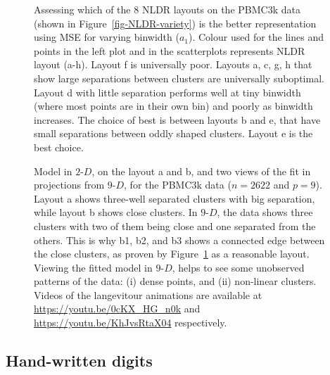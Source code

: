 \documentclass[
  12pt]{article}
\newcommand\gD{$2\text{-}D$}
\begin{document}
\begin{figure}[H]


\caption{\label{fig-pbmc-mse}Assessing which of the 8 NLDR layouts on
the PBMC3k data (shown in Figure~\ref{fig-NLDR-variety}) is the better
representation using MSE for varying binwidth (\(a_1\)). Colour used for
the lines and points in the left plot and in the scatterplots represents
NLDR layout (a-h). Layout f is universally poor. Layouts a, c, g, h that
show large separations between clusters are universally suboptimal.
Layout d with little separation performs well at tiny binwidth (where
most points are in their own bin) and poorly as binwidth increases. The
choice of best is between layouts b and e, that have small separations
between oddly shaped clusters. Layout e is the best choice.}

\end{figure}%

\begin{figure}[H]


\caption{\label{fig-model-pbmc-author-proj}Model in \gD{}, on the layout
a and b, and two views of the fit in projections from \(9\text{-}D\),
for the PBMC3k data (\(n =  2622\) and \(p = 9\)). Layout a shows
three-well separated clusters with big separation, while layout b shows
close clusters. In \(9\text{-}D\), the data shows three clusters with
two of them being close and one separated from the others. This is why
b1, b2, and b3 shows a connected edge between the close clusters, as
proven by Figure~\ref{fig-pbmc-mse} as a reasonable layout. Viewing the
fitted model in \(9\text{-}D\), helps to see some unobserved patterns of
the data: (i) dense points, and (ii) non-linear clusters. Videos of the
langevitour animations are available at
\url{https://youtu.be/0cKX_HG_n0k} and
\url{https://youtu.be/KhJvsRtaX04} respectively.}

\end{figure}%

\subsection{Hand-written digits}\label{hand-written-digits}
\end{document}
